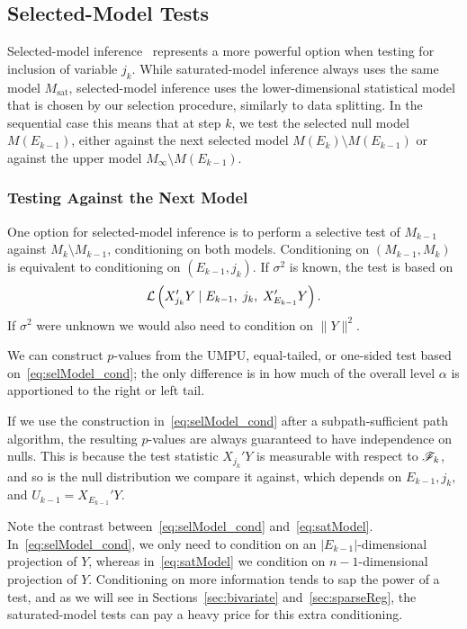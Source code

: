 \documentclass{article}
\begin{document}
\subsection{Selected-Model Tests}
Selected-model inference~\citep{fithian2014optimal} 
represents a more powerful option when testing for inclusion of variable $j_k$. While saturated-model inference always uses the same model $M_{\text{sat}}$, selected-model inference uses the lower-dimensional statistical model that is chosen by our selection procedure, similarly to data splitting. In the sequential case this means that at step $k$, we test the selected null model $M(E_{k-1})$, either against the next selected model $M(E_k)\setminus M(E_{k-1})$ or against the upper model $M_\infty\setminus M(E_{k-1})$.

\subsubsection{Testing Against the Next Model}\label{sec:identify}
One option for selected-model inference is to perform a selective test of $M_{k-1}$ against $M_{k}\setminus M_{k-1}$, conditioning on both models. Conditioning on $(M_{k-1},M_k)$ is equivalent to conditioning on $(E_{k-1}, j_k)$. If $\sigma^2$ is known, the test is based on
\begin{equation}\label{eq:selModel_cond}
\mathcal{L}\left(X_{j_k}'Y \mid E_{k-1}, \; j_k, \; X_{E_{k-1}}'Y\right).
\end{equation}
If $\sigma^2$ were unknown we would also need to condition on $\|Y\|^2$.

We can construct $p$-values from the UMPU, equal-tailed, or one-sided test based on~\eqref{eq:selModel_cond}; the only difference is in how much of the overall level $\alpha$ is apportioned to the right or left tail. 

If we use the construction in~\eqref{eq:selModel_cond} after a subpath-sufficient path algorithm, the resulting $p$-values are always guaranteed to have independence on nulls. This is because the test statistic $X_{j_k}'Y$ is measurable with respect to $\mathscr{F}_k$, and so is the null distribution we compare it against, which depends on $E_{k-1}, j_k,$ and $U_{k-1} = X_{E_{k-1}}'Y$.

Note the contrast between~\eqref{eq:selModel_cond} and~\eqref{eq:satModel}. In~\eqref{eq:selModel_cond}, we only need to condition on an $|E_{k-1}|$-dimensional projection of $Y$, whereas in~\eqref{eq:satModel} we condition on $n-1$-dimensional projection of $Y$. Conditioning on more information tends to sap the power of a test, and as we will see in Sections~\ref{sec:bivariate} and~\ref{sec:sparseReg}, the saturated-model tests can pay a heavy price for this extra conditioning.
\end{document}
